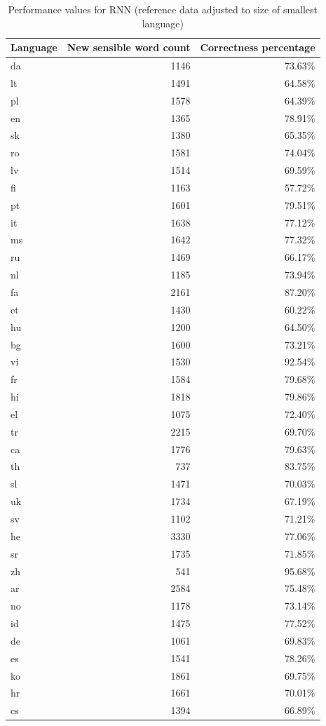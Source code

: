\documentclass[11pt,a4paper,twoside,openright]{scrbook}
\begin{document}
\begin{table}[h]
\centering
\caption{Performance values for RNN (reference data adjusted to size of smallest language)}
\label{table:rnn}
\begin{tabular}{lrr}
\textbf{Language} & \textbf{New sensible word count} & \textbf{Correctness percentage} \\ \hline \hline
da & 1146 & 73.63\% \\ \hline
lt & 1491 & 64.58\% \\ \hline
pl & 1578 & 64.39\% \\ \hline
en & 1365 & 78.91\% \\ \hline
sk & 1380 & 65.35\% \\ \hline
ro & 1581 & 74.04\% \\ \hline
lv & 1514 & 69.59\% \\ \hline
fi & 1163 & 57.72\% \\ \hline
pt & 1601 & 79.51\% \\ \hline
it & 1638 & 77.12\% \\ \hline
ms & 1642 & 77.32\% \\ \hline
ru & 1469 & 66.17\% \\ \hline
nl & 1185 & 73.94\% \\ \hline
fa & 2161 & 87.20\% \\ \hline
et & 1430 & 60.22\% \\ \hline
hu & 1200 & 64.50\% \\ \hline
bg & 1600 & 73.21\% \\ \hline
vi & 1530 & 92.54\% \\ \hline
fr & 1584 & 79.68\% \\ \hline
hi & 1818 & 79.86\% \\ \hline
el & 1075 & 72.40\% \\ \hline
tr & 2215 & 69.70\% \\ \hline
ca & 1776 & 79.63\% \\ \hline
th & 737 & 83.75\% \\ \hline
sl & 1471 & 70.03\% \\ \hline
uk & 1734 & 67.19\% \\ \hline
sv & 1102 & 71.21\% \\ \hline
he & 3330 & 77.06\% \\ \hline
sr & 1735 & 71.85\% \\ \hline
zh & 541 & 95.68\% \\ \hline
ar & 2584 & 75.48\% \\ \hline
no & 1178 & 73.14\% \\ \hline
id & 1475 & 77.52\% \\ \hline
de & 1061 & 69.83\% \\ \hline
es & 1541 & 78.26\% \\ \hline
ko & 1861 & 69.75\% \\ \hline
hr & 1661 & 70.01\% \\ \hline
cs & 1394 & 66.89\% \\
\end{tabular}
\end{table}
\end{document}
